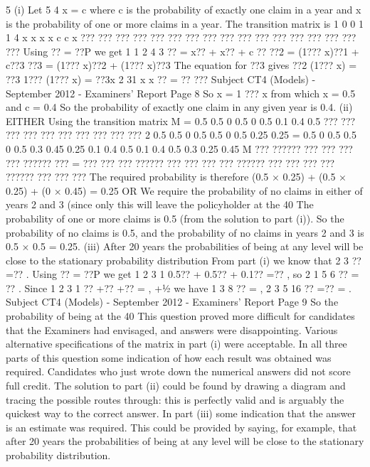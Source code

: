 5
(i) Let 5
4
x = c
where c is the probability of exactly one claim in a year and x is the probability of one
or more claims in a year.
The transition matrix is
1 0
0 1
1
4
x x
x x
c c x
??? ???
??? ??? ???
??? ???
??? ??? ???
??? ???
??? ??? ???
??? ???
Using ?? = ??P we get
1 1 2 4 3
?? = x?? + x?? + c ??
??2 = (1??? x)??1 + c??3
??3 = (1??? x)??2 + (1??? x)??3
The equation for ??3 gives
??2 (1??? x) = ??3 {1??? (1??? x)} = ??3x
2 31
x
x
?? = ??
???
Subject CT4 (Models) - September 2012 - Examiners' Report
Page 8
So x = 1 ??? x from which x = 0.5 and c = 0.4
So the probability of exactly one claim in any given year is 0.4.
(ii) EITHER
Using the transition matrix
M =
0.5 0.5 0
0.5 0 0.5
0.1 0.4 0.5
??? ???
??? ???
??? ???
??? ???
??? ???
2
0.5 0.5 0 0.5 0.5 0 0.5 0.25 0.25
= 0.5 0 0.5 0.5 0 0.5 0.3 0.45 0.25
0.1 0.4 0.5 0.1 0.4 0.5 0.3 0.25 0.45
M
??? ?????? ??? ??? ???
??? ?????? ??? = ??? ??? ??? ?????? ??? ??? ???
??? ?????? ??? ??? ???
??? ?????? ??? ??? ???
The required probability is therefore
(0.5 × 0.25) + (0.5 × 0.25) + (0 × 0.45) = 0.25
OR
We require the probability of no claims in either of years 2 and 3 (since only this will
leave the policyholder at the 40%
The probability of one or more claims is 0.5 (from the solution to part (i)).
So the probability of no claims is 0.5, and the probability of no claims in years 2 and 3
is 0.5 × 0.5 = 0.25.
(iii) After 20 years the probabilities of being at any level will be close to the
stationary probability distribution
From part (i) we know that 2 3 ?? =?? .
Using ?? = ??P we get
1 2 3 1 0.5?? + 0.5?? + 0.1?? =?? ,
so 2 1
5
6
?? = ?? .
Since 1 2 3 1 ?? +?? +?? = , +½
we have 1
3
8
?? = , 2 3
5
16
?? =?? = .
Subject CT4 (Models) - September 2012 - Examiners' Report
Page 9
So the probability of being at the 40%
This question proved more difficult for candidates that the Examiners had envisaged, and
answers were disappointing. Various alternative specifications of the matrix in part (i) were
acceptable. In all three parts of this question some indication of how each result was
obtained was required. Candidates who just wrote down the numerical answers did not
score full credit. The solution to part (ii) could be found by drawing a diagram and tracing
the possible routes through: this is perfectly valid and is arguably the quickest way to the
correct answer. In part (iii) some indication that the answer is an estimate was required.
This could be provided by saying, for example, that after 20 years the probabilities of being
at any level will be close to the stationary probability distribution.









